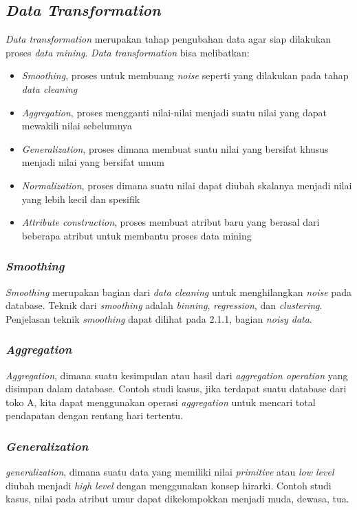 \subsection{\textsl{Data Transformation}}
\textsl{Data transformation} merupakan tahap pengubahan data agar siap dilakukan proses \textsl{data mining}. \textsl{Data transformation} bisa melibatkan:
	\begin{itemize}
		\item \textsl{Smoothing}, proses untuk membuang \textsl{noise} seperti yang dilakukan pada tahap \textsl{data cleaning}
		\item \textsl{Aggregation}, proses mengganti nilai-nilai menjadi suatu nilai yang dapat mewakili nilai sebelumnya
		\item \textsl{Generalization}, proses dimana membuat suatu nilai yang bersifat khusus menjadi nilai yang bersifat umum
		\item \textsl{Normalization}, proses dimana suatu nilai dapat diubah skalanya menjadi nilai yang lebih kecil dan spesifik
		\item \textsl{Attribute construction}, proses membuat atribut baru yang berasal dari beberapa atribut untuk membantu proses data mining
	\end{itemize}
	
\subsubsection{\textsl{Smoothing}}
\textsl{Smoothing} merupakan bagian dari \textsl{data cleaning} untuk menghilangkan \textsl{noise} pada database. Teknik dari \textsl{smoothing} adalah \textsl{binning}, \textsl{regression}, dan \textsl{clustering}. Penjelasan teknik \textsl{smoothing} dapat dilihat pada 2.1.1, bagian \textsl{noisy data}.

\subsubsection{\textsl{Aggregation}}
\textsl{Aggregation}, dimana suatu kesimpulan atau hasil dari \textsl{aggregation operation} yang disimpan dalam database. Contoh studi kasus, jika terdapat suatu database dari toko A, kita dapat menggunakan operasi \textsl{aggregation} untuk mencari total pendapatan dengan rentang hari tertentu.

\subsubsection{\textsl{Generalization}}	
\textsl{generalization}, dimana suatu data yang memiliki nilai \textsl{primitive} atau \textsl{low level} diubah menjadi \textsl{high level} dengan menggunakan konsep hirarki. Contoh studi kasus, nilai pada atribut umur dapat dikelompokkan menjadi muda, dewasa, tua.	
	
